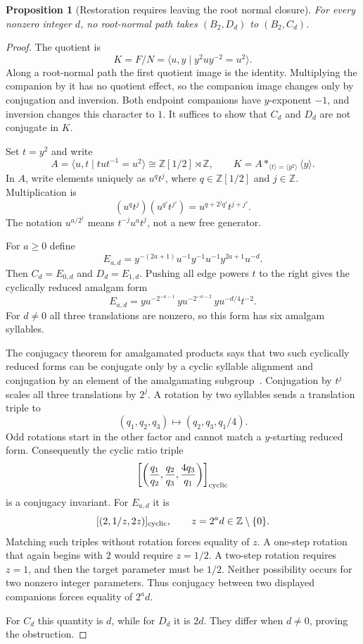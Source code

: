 \documentclass[11pt]{article}
\newtheorem{proposition}[theorem]{Proposition}
\theoremstyle{definition}\newtheorem{definition}[theorem]{Definition}
\theoremstyle{remark}\newtheorem{remark}[theorem]{Remark}
\begin{document}
\begin{proposition}[Restoration requires leaving the root normal closure]\label{prop:restoration}
For every nonzero integer $d$, no root-normal path takes $(B_2,D_d)$ to $(B_2,C_d)$.
\end{proposition}
\begin{proof}
The quotient is
\[
K=F/N=\langle u,y\mid y^2uy^{-2}=u^2\rangle.
\]
Along a root-normal path the first quotient image is the identity. Multiplying the companion by it has no quotient effect, so the companion image changes only by conjugation and inversion. Both endpoint companions have $y$-exponent $-1$, and inversion changes this character to $1$. It suffices to show that $C_d$ and $D_d$ are not conjugate in $K$.

Set $t=y^2$ and write
\[
A=\langle u,t\mid tut^{-1}=u^2\rangle
 \cong\mathbb Z[1/2]\rtimes\mathbb Z,
\qquad
K=A*_{\langle t\rangle=\langle y^2\rangle}\langle y\rangle.
\]
In $A$, write elements uniquely as $u^qt^j$, where $q\in\mathbb Z[1/2]$ and $j\in\mathbb Z$. Multiplication is
\[
(u^qt^j)(u^{q'}t^{j'})=u^{q+2^j q'}t^{j+j'}.
\]
The notation $u^{a/2^j}$ means $t^{-j}u^at^j$, not a new free generator.

For $a\ge0$ define
\[
E_{a,d}=y^{-(2a+1)}u^{-1}y^{-1}u^{-1}y^{2a+1}u^{-d}.
\]
Then $C_d=E_{0,d}$ and $D_d=E_{1,d}$. Pushing all edge powers $t$ to the right gives the cyclically reduced amalgam form
\[
E_{a,d}=yu^{-2^{-a-1}}\,yu^{-2^{-a-2}}\,yu^{-d/4}t^{-2}.
\]
For $d\ne0$ all three translations are nonzero, so this form has six amalgam syllables.

The conjugacy theorem for amalgamated products says that two such cyclically reduced forms can be conjugate only by a cyclic syllable alignment and conjugation by an element of the amalgamating subgroup~\cite[Theorems 2.10--2.11]{sklinos}. Conjugation by $t^j$ scales all three translations by $2^j$. A rotation by two syllables sends a translation triple to
\[
(q_1,q_2,q_3)\longmapsto(q_2,q_3,q_1/4).
\]
Odd rotations start in the other factor and cannot match a $y$-starting reduced form. Consequently the cyclic ratio triple
\[
\left[\left(\frac{q_1}{q_2},\frac{q_2}{q_3},\frac{4q_3}{q_1}\right)\right]_{\rm cyclic}
\]
is a conjugacy invariant. For $E_{a,d}$ it is
\[
[(2,1/z,2z)]_{\rm cyclic},\qquad z=2^a d\in\mathbb Z\setminus\{0\}.
\]
Matching such triples without rotation forces equality of $z$. A one-step rotation that again begins with $2$ would require $z=1/2$. A two-step rotation requires $z=1$, and then the target parameter must be $1/2$. Neither possibility occurs for two nonzero integer parameters. Thus conjugacy between two displayed companions forces equality of $2^a d$.

For $C_d$ this quantity is $d$, while for $D_d$ it is $2d$. They differ when $d\ne0$, proving the obstruction.
\end{proof}
\end{document}
